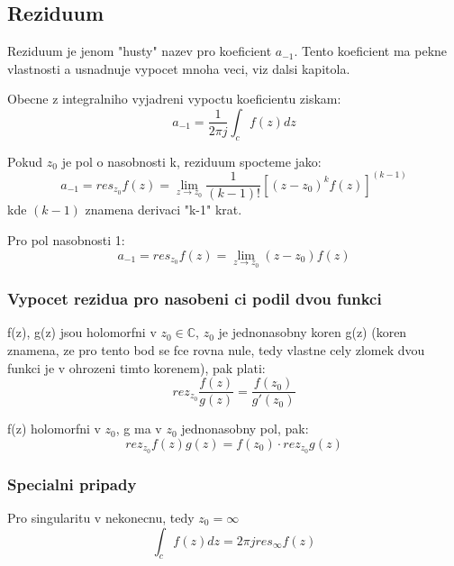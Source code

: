 \subsection*{Reziduum}

Reziduum je jenom "husty" nazev pro koeficient $a_{-1}$. Tento koeficient ma pekne vlastnosti a usnadnuje vypocet mnoha veci, viz dalsi kapitola.

Obecne z integralniho vyjadreni vypoctu koeficientu ziskam:
\begin{equation}
\label{eq:rez_int}
a_{-1} = \frac{1}{2\pi j} \int_c f(z) dz
\end{equation}

Pokud $z_0$ je pol o nasobnosti k, reziduum spocteme jako:
\begin{equation}
\label{eq:rez_polk}
a_{-1} = res_{z_0} f(z) = \lim_{z \to z_0} \frac{1}{(k-1)!}\left[ (z-z_0)^k f(z)\right]^{(k-1)}
\end{equation}
kde $(k-1)$ znamena derivaci "k-1" krat.

Pro pol nasobnosti 1:
\begin{equation}
\label{eq:rez_pol1}
a_{-1} = res_{z_0} f(z) = \lim_{z \to z_0} (z-z_0)f(z)
\end{equation}

\subsubsection*{Vypocet rezidua pro nasobeni ci podil dvou funkci}
f(z), g(z) jsou holomorfni v $z_0 \in \mathbb{C}$, $z_0$ je jednonasobny koren g(z) (koren znamena, ze pro tento bod se fce rovna nule, tedy vlastne cely zlomek dvou funkci je v ohrozeni timto korenem), pak plati:
\begin{equation}
\label{eq:rez_pod}
rez_{z_0} \frac{f(z)}{g(z)} = \frac{f(z_0)}{g'(z_0)}
\end{equation}

f(z) holomorfni v $z_0$, g ma v $z_0$ jednonasobny pol, pak:
\begin{equation}
\label{eq:rez_nas}
rez_{z_0} f(z)g(z) = f(z_0) \cdot rez_{z_0} g(z)
\end{equation}

\subsubsection*{Specialni pripady}

Pro singularitu v nekonecnu, tedy $z_0 = \infty$
\begin{equation}
\label{eq:rez_nekon}
\int_c f(z) dz = 2\pi j res_\infty f(z)
\end{equation}

